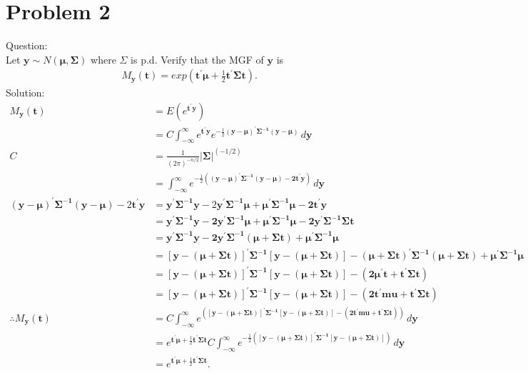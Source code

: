 \documentclass{article}
\begin{document}
\section{Problem 2}
Question:\\ 
Let $\bm{y} \sim N(\bm{\mu},\bm{\Sigma})$ where $\Sigma$ is
p.d. Verify that the MGF of $\bm{y}$ is 
\begin{align*}
  &M_{\bm{y}}(\bm{t})=exp(\bm{t^{\prime}\mu}+\frac{1}{2}\bm{t^{\prime}\Sigma
  t})
.
\end{align*}
Solution:\\
\begin{align*}
  M_{\bm{y}}(\bm{t})&=E(e^{\bm{t^{\prime}y}})\\
  &=C\int_{-\infty}^{\infty}e^{\bm{t^{\prime}y}}e^{-\frac{1}{2}\bm{(y-\mu)^{\prime}}\bm{\Sigma^{-1}(y-\mu)}}\,d\bm{y}\\
  C&=\frac{1}{(2\pi)^{-n/2}}|\bm{\Sigma}|^(-1/2)\\
  &=\int_{-\infty}^{\infty}e^{-\frac{1}{2}\bm{((y-\mu)^{\prime}\Sigma^{-1}(y-\mu)-2t^{\prime}y)}}\,d\bm{y}\\
 \bm{(y-\mu)^{\prime}\Sigma^{-1}(y-\mu)}-2\bm{t^{\prime}y}&=\bm{y^{\prime}\Sigma^{-1}y}-2\bm{y^{\prime}\Sigma^{-1}\mu+\mu^{\prime}\Sigma^{-1}\mu-2t^{\prime}y}\\
  &=\bm{y^{\prime}\Sigma^{-1}y-2y^{\prime}\Sigma^{-1}\mu+\mu^{\prime}\Sigma^{-1}\mu-2y^{\prime}\Sigma^{-1}\Sigma
  t}\\
  &=\bm{y^{\prime}\Sigma^{-1}y-2y^{\prime}\Sigma^{-1}(\mu+\Sigma t)+\mu^{\prime}\Sigma^{-1}\mu}\\
  &=\bm{[y-(\mu+\Sigma t)]^{\prime}\Sigma^{-1}[y-(\mu+\Sigma
  t)]-(\mu+\Sigma t)^{\prime}\Sigma^{-1}(\mu+\Sigma t)+\mu^{\prime}\Sigma^{-1}\mu}\\
  &=\bm{[y-(\mu+\Sigma t)]^{\prime}\Sigma^{-1}[y-(\mu+\Sigma
  t)]-(2\mu^{\prime}t+t^{\prime}\Sigma t)}\\
  &=\bm{[y-(\mu+\Sigma t)]^{\prime}\Sigma^{-1}[y-(\mu+\Sigma
  t)]-(2t^{\prime}mu+t^{\prime}\Sigma t)}\\
  \therefore M_{\bm{y}}(\bm{t})&=C\int_{-\infty}^{\infty}e^{\bm{([y-(\mu+\Sigma t)]^{\prime}\Sigma^{-1}[y-(\mu+\Sigma
  t)]-(2t^{\prime}mu+t^{\prime}\Sigma t))}}\,d\bm{y}\\
&=e^{\bm{t^{\prime}\mu}+\frac{1}{2}\bm{t^{\prime}\Sigma t}}C\int_{-\infty}^{\infty}e^{-\frac{1}{2}\bm{([y-(\mu+\Sigma t)]^{\prime}\Sigma^{-1}[y-(\mu+\Sigma
  t)])}}\,d\bm{y}\\
&=e^{\bm{t^{\prime}\mu}+\frac{1}{2}\bm{t^{\prime}\Sigma t}}
  .
  \end{align*}
       
\end{document}
